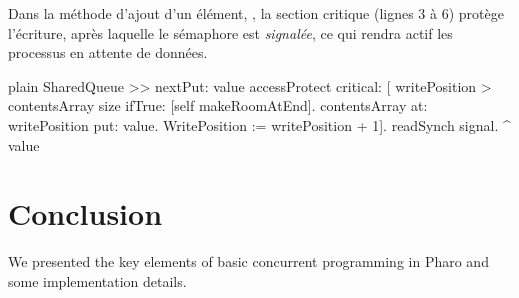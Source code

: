 \documentclass[10pt,twoside,english]{_support/latex/sbabook/sbabook}
\begin{document}
Dans la m\'{e}thode d’ajout d’un \'{e}l\'{e}ment, , la section critique (lignes 3 \`{a} 6) prot\`{e}ge l’\'{e}criture, apr\`{e}s laquelle le s\'{e}maphore  est \textit{signal\'{e}e}, ce qui rendra actif les processus en attente de donn\'{e}es.

\begin{displaycode}{plain}
SharedQueue >> nextPut: value 
	accessProtect
		critical: [ writePosition > contentsArray size
				ifTrue: [self makeRoomAtEnd].
			contentsArray at: writePosition put: value.
			WritePosition := writePosition + 1].
			readSynch signal.
			^ value
\end{displaycode}
\section{Conclusion}
We presented the key elements of basic concurrent programming in Pharo and some implementation details.


\backmatter

\end{document}
